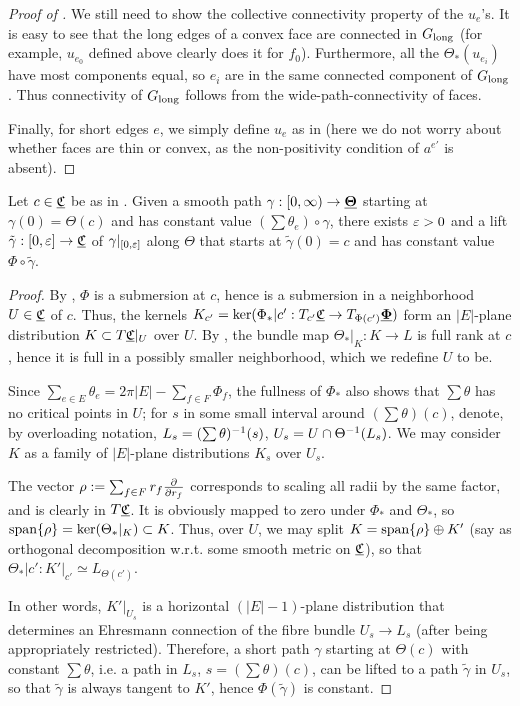 \begin{proof}[Proof of ]
We still need to show the collective connectivity property of the $u_e$'s.
It is easy to see that the long edges of a convex face
are connected in $G_{\text{long}}$
(for example, $u_{e_0}$ defined above clearly does it for
$f_0$).
Furthermore, all the $\Theta_*(u_{e_i})$ have most components equal,
so $e_i$ are in the same connected component of $G_{\text{long}}$.
Thus connectivity of $G_{\text{long}}$ follows from the
wide-path-connectivity of faces.


Finally, for short edges $e$, we simply define $u_e$
as in 
(here we do not worry about whether faces are thin or convex,
as the non-positivity condition of $a^{e'}$ is absent).
\end{proof}


\begin{proposition}
\label{p:nghd_lift}
Let $c\in {\underline{\mathfrak{C}}}$ be as in .
Given a smooth path $\gamma: [0,\infty) \to {\underline{\mathbf{\Theta}}}$
starting at $\gamma(0) = \Theta(c)$
and has constant value $(\sum \theta_e) \circ \gamma$,
there exists $\varepsilon > 0$ and a lift $\tilde{\gamma} :[0, \varepsilon] \to {\underline{\mathfrak{C}}}$
of $\gamma|_{[0,\varepsilon]}$ along $\Theta$
that starts at $\tilde{\gamma}(0) = c$
and has constant value $\Phi \circ \tilde{\gamma}$.
\end{proposition}


\begin{proof}
By , $\Phi$ is a submersion at $c$,
hence is a submersion in a neighborhood $U \in {\underline{\mathfrak{C}}}$ of $c$.
Thus, the kernels
$K_{c'} = \ker(\Phi_*|{c'} : T_{c'} {\underline{\mathfrak{C}}} \to T_{\Phi(c')} {\underline{\mathbf{\Phi}}})$
form an $|E|$-plane distribution $K \subset T{\underline{\mathfrak{C}}}|_U$ over $U$.
By , the bundle map
$\Theta_*|_K : K \to L$ is full rank at $c$,
hence it is full in a possibly smaller neighborhood,
which we redefine $U$ to be.


Since $\sum_{e \in E} \theta_e = 2\pi |E| - \sum_{f\in F} \Phi_f$,
the fullness of $\Phi_*$ also shows that
$\sum \theta$ has no critical points in $U$;
for $s$ in some small interval around $(\sum \theta)(c)$,
denote, by overloading notation,
$L_s = (\sum \theta)^{-1} (s)$,
$U_s = U \cap \Theta^{-1}(L_s)$.
We may consider $K$ as a family of $|E|$-plane distributions
$K_s$ over $U_s$.


The vector $\rho := \sum_{f\in F} r_f {\frac{\partial}{\partial r_f}}$ corresponds to
scaling all radii by the same factor, and is clearly in $T{\underline{\mathfrak{C}}}$.
It is obviously mapped to zero under $\Phi_*$ and $\Theta_*$,
so ${\text{span}}\{\rho\} = \ker(\Theta_*|_K) \subset K$.
Thus, over $U$, we may split
$K = {\text{span}}\{\rho\} \oplus K'$
(say as orthogonal decomposition w.r.t. some smooth metric on ${\underline{\mathfrak{C}}}$),
so that $\Theta_*|{c'} : K'|_{c'} \simeq L_{\Theta(c')}$.


In other words, $K'|_{U_s}$ is a horizontal $(|E|-1)$-plane distribution
that determines an Ehresmann connection of the
fibre bundle $U_s \to L_s$ (after being appropriately restricted).
Therefore, a short path $\gamma$ starting at $\Theta(c)$
with constant $\sum \theta$, i.e. a path in $L_s$, $s ={(\sum \theta)(c)}$,
can be lifted to a path $\tilde{\gamma}$ in $U_s$,
so that $\tilde{\gamma}$ is always tangent to $K'$,
hence $\Phi(\tilde{\gamma})$ is constant.
\end{proof}

